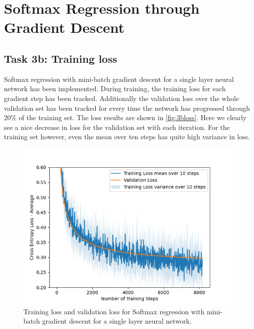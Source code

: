 \documentclass{article}
\begin{document}
\section{Softmax Regression through Gradient Descent}
\subsection{Task 3b: Training loss}

Softmax regression with mini-batch gradient descent for a single layer neural network has been implemented. During training, the training loss for each gradient step has been tracked. Additionally the validation loss over the whole validation set has been tracked for every time the network has progressed through 20\% of the training set. The loss results are shown in \autoref{fig:3bloss}. Here we clearly see a nice decrease in loss for the validation set with each iteration. For the training set however, even the mean over ten steps has quite high variance in loss. 

\begin{figure}[H]
    \centering
    \includegraphics[width = \textwidth]{Assignment_1/Assignments/plots/task3/task3b_softmax_train_loss.png}
    \caption{Training loss and validation loss for Softmax regression with mini-batch gradient descent for a single layer neural network.}
    \label{fig:3bloss}
\end{figure}
\end{document}
